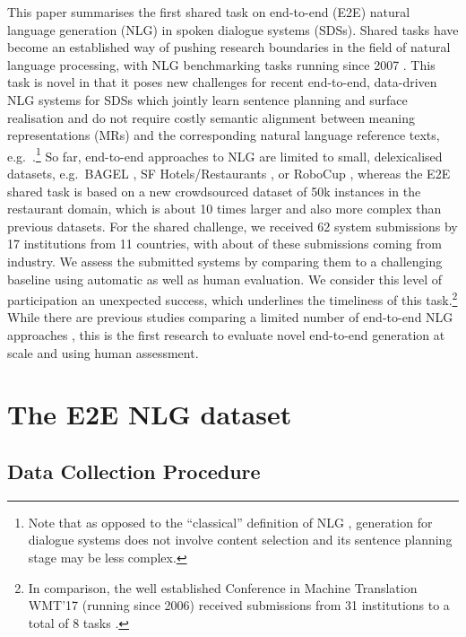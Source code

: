 \documentclass[11pt,a4paper]{article}
\begin{document}
This paper summarises the first shared task on 
 end-to-end (E2E) natural language generation (NLG) in spoken dialogue systems (SDSs). 
Shared tasks have become an established way of pushing research boundaries in the field of natural language processing, with NLG benchmarking tasks running since 2007 \citep{belz:GRE2007}. This task is novel in that it poses new challenges for 
recent end-to-end, data-driven NLG systems for SDSs which jointly learn sentence planning and surface realisation and do not require costly semantic alignment between meaning representations (MRs) and the corresponding natural language reference texts, e.g.\ \cite{jurcicek:2015:ACL,wen:emnlp2015,Mei:NAACL2016,Wen:NAACL16,SharmaHSSB16,Dusek:ACL16,vlachos:coling2016}.\footnote{Note that as opposed to the ``classical'' definition of NLG \cite{reiter_building_2000,gatt_survey_2018}, generation for dialogue systems does not involve content selection and its sentence planning stage may be less complex.}
So far, end-to-end approaches to NLG are limited to small, delexicalised datasets, e.g.\ BAGEL \citep{mairesse:acl2010}, SF Hotels/\hspace{0mm}Restaurants \citep{wen:emnlp2015}, or RoboCup \citep{chen2008learning}, whereas the E2E shared task is
based on a new crowdsourced dataset of 50k instances in the restaurant domain, which is about 10 times larger and also more complex than previous datasets.
For the shared challenge, we received 62 system submissions by 17 institutions from 11 countries, with about  of these submissions coming from industry. 
We assess the submitted systems by comparing them to a challenging baseline using automatic as well as human evaluation.
We consider this level of participation an unexpected success, which underlines the timeliness of this task.\footnote{In comparison, the well established Conference in Machine Translation WMT’17 (running since 2006) received submissions from 31 institutions to a total of 8 tasks \citep{bojar2017findings}.}
While there are previous studies comparing a limited number of end-to-end NLG approaches \cite{Novikova:EMNLP2017,Wiseman:EMNLP17,WebNLG},
this is the first research to evaluate novel end-to-end generation at scale and using human assessment. 




\section{The E2E NLG dataset}\label{sec:dataset}

\subsection{Data Collection Procedure}\label{sec:collection}
\end{document}
